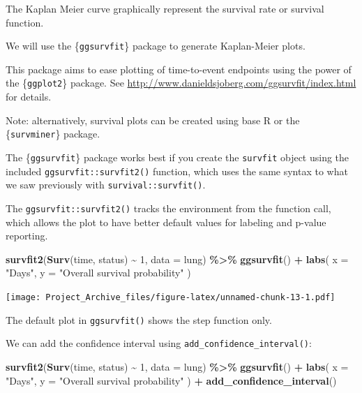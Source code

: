 \documentclass[
]{book}
\newenvironment{Shaded}{\begin{snugshade}}{\end{snugshade}}
\newcommand{\AttributeTok}[1]{\textcolor[rgb]{0.13,0.29,0.53}{#1}}
\newcommand{\DecValTok}[1]{\textcolor[rgb]{0.00,0.00,0.81}{#1}}
\newcommand{\FunctionTok}[1]{\textcolor[rgb]{0.13,0.29,0.53}{\textbf{#1}}}
\newcommand{\NormalTok}[1]{#1}
\newcommand{\SpecialCharTok}[1]{\textcolor[rgb]{0.81,0.36,0.00}{\textbf{#1}}}
\newcommand{\StringTok}[1]{\textcolor[rgb]{0.31,0.60,0.02}{#1}}
\begin{document}
The Kaplan Meier curve graphically represent the survival rate or survival function.

We will use the \{\texttt{ggsurvfit}\} package to generate Kaplan-Meier plots.

This package aims to ease plotting of time-to-event endpoints using the power of the \{\texttt{ggplot2}\} package. See \url{http://www.danieldsjoberg.com/ggsurvfit/index.html} for details.

Note: alternatively, survival plots can be created using base R or the \{\texttt{survminer}\} package.

The \{\texttt{ggsurvfit}\} package works best if you create the \texttt{survfit} object using the included \texttt{ggsurvfit::survfit2()} function, which uses the same syntax to what we saw previously with \texttt{survival::survfit()}.

The \texttt{ggsurvfit::survfit2()} tracks the environment from the function call, which allows the plot to have better default values for labeling and p-value reporting.

\begin{Shaded}
\begin{Highlighting}[]
\FunctionTok{survfit2}\NormalTok{(}\FunctionTok{Surv}\NormalTok{(time, status) }\SpecialCharTok{\textasciitilde{}} \DecValTok{1}\NormalTok{, }\AttributeTok{data =}\NormalTok{ lung) }\SpecialCharTok{\%\textgreater{}\%} 
  \FunctionTok{ggsurvfit}\NormalTok{() }\SpecialCharTok{+}
  \FunctionTok{labs}\NormalTok{(}
    \AttributeTok{x =} \StringTok{"Days"}\NormalTok{,}
    \AttributeTok{y =} \StringTok{"Overall survival probability"}
\NormalTok{  )}
\end{Highlighting}
\end{Shaded}

\texttt{[image: Project\_Archive\_files/figure-latex/unnamed-chunk-13-1.pdf]}

The default plot in \texttt{ggsurvfit()} shows the step function only.

We can add the confidence interval using \texttt{add\_confidence\_interval()}:

\begin{Shaded}
\begin{Highlighting}[]
\FunctionTok{survfit2}\NormalTok{(}\FunctionTok{Surv}\NormalTok{(time, status) }\SpecialCharTok{\textasciitilde{}} \DecValTok{1}\NormalTok{, }\AttributeTok{data =}\NormalTok{ lung) }\SpecialCharTok{\%\textgreater{}\%} 
  \FunctionTok{ggsurvfit}\NormalTok{() }\SpecialCharTok{+}
  \FunctionTok{labs}\NormalTok{(}
    \AttributeTok{x =} \StringTok{"Days"}\NormalTok{,}
    \AttributeTok{y =} \StringTok{"Overall survival probability"}
\NormalTok{  ) }\SpecialCharTok{+} 
  \FunctionTok{add\_confidence\_interval}\NormalTok{()}
\end{Highlighting}
\end{Shaded}
\end{document}
